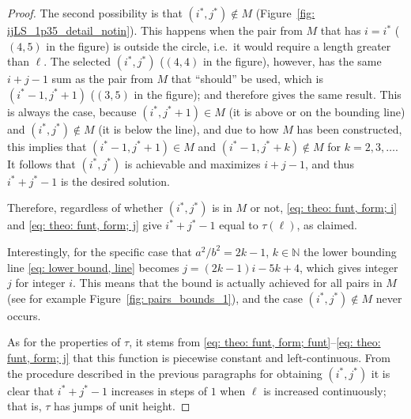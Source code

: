 \documentclass[12pt, a4paper]{article}
\newcommand{\funt}{\tau} %
\newcommand{\len}{\ell} %
\newcommand{\isoli}{i^\ast}
\newcommand{\jsoli}{j^\ast}
\newcommand{\mss}{M}
\begin{document}
\begin{proof}
The second possibility is that $(\isoli,\jsoli) \notin \mss$ (Figure~\ref{fig: ijLS_1p35_detail_notin}). This happens when the pair from $\mss$ that has $i = \isoli$ ($(4,5)$ in the figure) is outside the circle, i.e.~it would require a length greater than $\len$. The selected $(\isoli,\jsoli)$ ($(4,4)$ in the figure), however, has the same $i+j-1$ sum as the pair from $\mss$ that ``should'' be used, which is $(\isoli-1,\jsoli+1)$ ($(3,5)$ in the figure); and therefore gives the same result. This is always the case, because  $(\isoli,\jsoli+1) \in \mss$ (it is above or on the bounding line) and $(\isoli,\jsoli) \notin \mss$ (it is below the line), and due to how $\mss$ has been constructed, this implies that $(\isoli-1,\jsoli+1) \in \mss$ and $(\isoli-1,\jsoli+k) \notin \mss$ for $k =2, 3, \ldots$. It follows that $(\isoli,\jsoli)$ is achievable and maximizes $i+j-1$, and thus $\isoli+\jsoli-1$ is the desired solution.

Therefore, regardless of whether $(\isoli,\jsoli)$ is in $\mss$ or not, \eqref{eq: theo: funt, form; i} and \eqref{eq: theo: funt, form; j} give $\isoli+\jsoli-1$ equal to $\funt(\len)$, as claimed.

Interestingly, for the specific case that $a^2/b^2 = 2k-1$, $k \in \mathbb N$ the lower bounding line \eqref{eq: lower bound, line} becomes $j = (2k-1)i - 5k + 4$, which gives integer $j$ for integer $i$. This means that the bound is actually achieved for all pairs in $\mss$ (see for example Figure~\ref{fig: pairs_bounds_1}), and the case $(\isoli,\jsoli) \notin \mss$ never occurs.

As for the properties of $\funt$, it stems from \eqref{eq: theo: funt, form; funt}--\eqref{eq: theo: funt, form; j} that this function is piecewise constant and left-continuous. From the procedure described in the previous paragraphs for obtaining $(\isoli, \jsoli)$ it is clear that $\isoli+\jsoli-1$ increases in steps of $1$ when $\len$ is increased continuously; that is, $\funt$ has jumps of unit height.


\end{proof}
\end{document}
